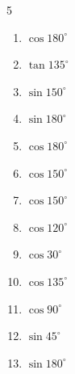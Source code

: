 \begin{multicols}{5}
\begin{enumerate}
  \item $\displaystyle \cos{180^\circ}$

        \phantom{$\displaystyle =-1$}

  \item $\displaystyle \tan{135^\circ}$

        \phantom{$\displaystyle =-1$}

  \item $\displaystyle \sin{150^\circ}$


  \item $\displaystyle \sin{180^\circ}$

        \phantom{$\displaystyle =0$}

  \item $\displaystyle \cos{180^\circ}$

        \phantom{$\displaystyle =-1$}

\columnbreak %

  \item $\displaystyle \cos{150^\circ}$


  \item $\displaystyle \cos{150^\circ}$


  \item $\displaystyle \cos{120^\circ}$


  \item $\displaystyle \cos{30^\circ}$


  \item $\displaystyle \cos{135^\circ}$


  \item $\displaystyle \cos{90^\circ}$

        \phantom{$\displaystyle =0$}

  \item $\displaystyle \sin{45^\circ}$


  \item $\displaystyle \sin{180^\circ}$


\end{enumerate}
\end{multicols}
